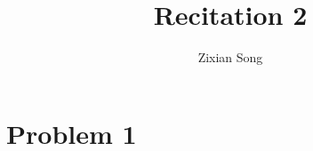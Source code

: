 \documentclass[a4paper]{article}
\title{Recitation 2}
\author{Zixian Song}
\begin{document}
\maketitle


\section{Problem 1}
\end{document}
